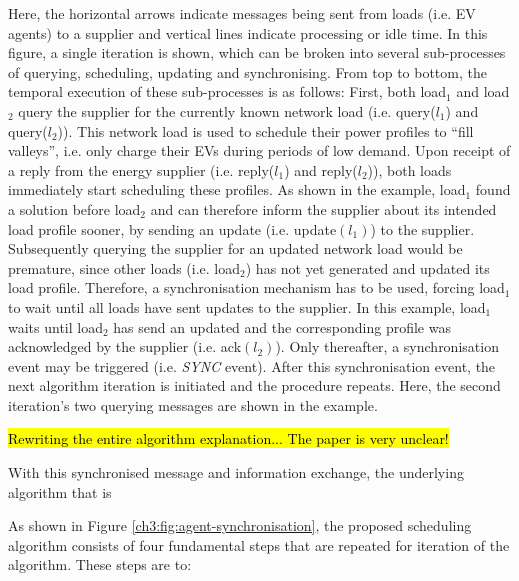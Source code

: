 Here, the horizontal arrows indicate messages being sent from loads (i.e. EV agents) to a supplier and vertical lines indicate processing or idle time.
In this figure, a single iteration is shown, which can be broken into several sub-processes of querying, scheduling, updating and synchronising.
From top to bottom, the temporal execution of these sub-processes is as follows:
First, both load$_1$ and load$_2$ query the supplier for the currently known network load (i.e. query($l_1$) and query($l_2$)).
This network load is used to schedule their power profiles to ``fill valleys'', i.e. only charge their EVs during periods of low demand.
Upon receipt of a  reply from the energy supplier (i.e. reply($l_1$) and reply($l_2$)), both loads immediately start scheduling these profiles.
As shown in the example, load$_1$ found a solution before load$_2$ and can therefore inform the supplier about its intended load profile sooner, by sending an update (i.e. update$(l_1)$) to the supplier.
Subsequently querying the supplier for an updated network load would be premature, since other loads (i.e. load$_2$) has not yet generated and updated its load profile.
Therefore, a synchronisation mechanism has to be used, forcing load$_1$ to wait until all loads have sent updates to the supplier.
In this example, load$_1$ waits until load$_2$ has send an updated and the corresponding profile was acknowledged by the supplier (i.e. ack$(l_2)$).
Only thereafter, a synchronisation event may be triggered (i.e. \textit{SYNC} event).
After this synchronisation event, the next algorithm iteration is initiated and the procedure repeats.
Here, the second iteration's two querying messages are shown in the example.


\hl{Rewriting the entire algorithm explanation... The paper is very unclear!}

With this synchronised message and information exchange, the underlying algorithm that is

As shown in Figure \ref{ch3:fig:agent-synchronisation}, the proposed scheduling algorithm consists of four fundamental steps that are repeated for iteration of the algorithm.
These steps are to:

